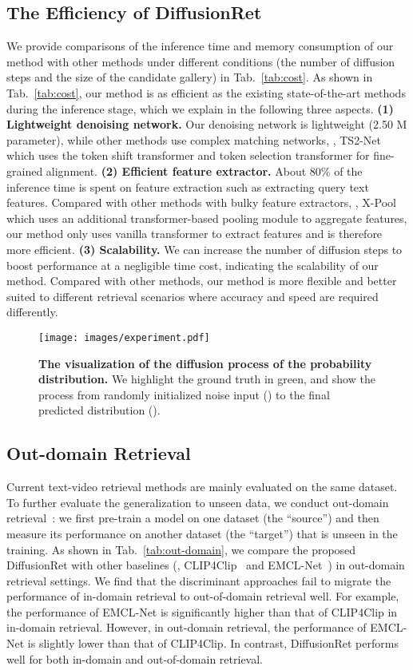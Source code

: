 \documentclass[10pt,twocolumn,letterpaper]{article}
\begin{document}
{\subsection{The Efficiency of DiffusionRet}
We provide comparisons of the inference time and memory consumption of our method with other methods under different conditions (the number of diffusion steps and the size of the candidate gallery) in Tab.~\ref{tab:cost}. As shown in Tab.~\ref{tab:cost}, our method is as efficient as the existing state-of-the-art methods during the inference stage, which we explain in the following three aspects. \textbf{(1) Lightweight denoising network.} Our denoising network is lightweight (2.50 M parameter), while other methods use complex matching networks, \eg, TS2-Net which uses the token shift transformer and token selection transformer for fine-grained alignment. \textbf{(2) Efficient feature extractor.} About 80\% of the inference time is spent on feature extraction such as extracting query text features. Compared with other methods with bulky feature extractors, \eg, X-Pool which uses an additional transformer-based pooling module to aggregate features, our method only uses vanilla transformer to extract features and is therefore more efficient. \textbf{(3) Scalability.} We can increase the number of diffusion steps to boost performance at a negligible time cost, indicating the scalability of our method. Compared with other methods, our method is more flexible and better suited to different retrieval scenarios where accuracy and speed are required differently.

\begin{figure*}[tbp]
\centering
\texttt{[image: images/experiment.pdf]}
\vspace{-1.5em}
\caption{\textbf{The visualization of the diffusion process of the probability distribution.} We highlight the ground truth in green, and show the process from randomly initialized noise input () to the final predicted distribution ().}
\label{fig:v}
\end{figure*}

\subsection{Out-domain Retrieval}
Current text-video retrieval methods are mainly evaluated on the same dataset. To further evaluate the generalization to unseen data, we conduct out-domain retrieval~\cite{chen2020fine}: we first pre-train a model on one dataset (the ``source'') and then measure its performance on another dataset (the ``target'') that is unseen in the training. As shown in Tab.~\ref{tab:out-domain}, we compare the proposed DiffusionRet with other baselines (\ie, CLIP4Clip~\cite{luo2021clip4clip} and EMCL-Net~\cite{jin2022expectation}) in out-domain retrieval settings. We find that the discriminant approaches fail to migrate the performance of in-domain retrieval to out-of-domain retrieval well. For example, the performance of EMCL-Net is significantly higher than that of CLIP4Clip in in-domain retrieval. However, in out-domain retrieval, the performance of EMCL-Net is slightly lower than that of CLIP4Clip. In contrast, DiffusionRet performs well for both in-domain and out-of-domain retrieval.

}
\end{document}
